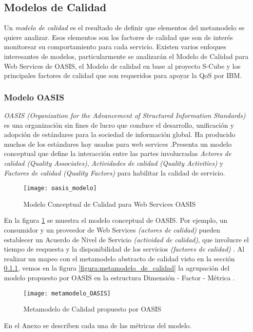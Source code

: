 \subsection{Modelos de Calidad}
\label{MarcoConceptual:modelos_calidad}
Un \emph{modelo de calidad} es el resultado de definir que elementos del metamodelo se quiere analizar. Esos elementos son los factores de calidad que son de interés monitorear su comportamiento para cada servicio. Existen varios enfoques interesantes de modelos, particularmente se analizarán el Modelo de Calidad para Web Services de OASIS, el Modelo de calidad en base al proyecto S-Cube y los principales factores de calidad que son requeridos para apoyar la QoS por IBM.
\subsubsection{Modelo OASIS}
\label{MarcoConceptual:modelo_OASIS}
\emph{OASIS (Organization for the Advancement of Structured Information Standards)} es una organización sin fines de lucro que conduce el desarrollo, unificación y adopción de estándares para la sociedad de información global. Ha producido muchos de los estándares hoy usados para web services \cite{OASIS:def}.Presenta un modelo conceptual que define la interacción entre las partes involucradas \emph{Actores de calidad (Quality Associates)}, \emph{Actividades de calidad (Quality Activities)} y \emph{Factores de calidad (Quality Factors)} para habilitar la calidad de servicio.
  \begin{figure}[h]
    \centering
    \texttt{[image: oasis\_modelo]}
    \caption{Modelo Conceptual de Calidad para Web Services OASIS}
    \label{figura:oasis_modelo}
  \end{figure}
En la figura \ref{figura:oasis_modelo} se muestra el modelo conceptual de OASIS. Por ejemplo, un consumidor y un proveedor de Web Services \emph{(actores de calidad)} pueden establecer un Acuerdo de Nivel de Servicio \emph{(actividad de calidad)}, que involucre el tiempo de respuesta y la disponibilidad de los servicios \emph{(factores de calidad)} \cite{Tesis:LauraGonzalez:PlataformaESB}.
Al realizar un mapeo con el metamodelo abstracto de calidad visto en la sección \ref{MarcoConceptual:modelo_OASIS}, vemos en la figura \ref{figura:metamodelo_de_calidad} la agrupación del modelo propuesto por OASIS en la estructura Dimensión - Factor - Métrica \cite{Articulo:LauraGonzalez:CalidadWS}.
  \begin{figure}[h]
    \centering
    \texttt{[image: metamodelo\_OASIS]}
    \caption{Metamodelo de Calidad propuesto por OASIS}
    \label{figura:metamodelo_OASIS}
  \end{figure}
En el Anexo se describen cada una de las métricas del modelo.

